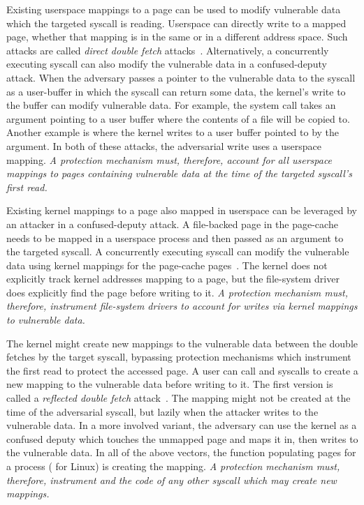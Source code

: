 \documentclass[letterpaper,twocolumn,10pt, anonymous]{article}
\begin{document}
Existing userspace mappings to a page can be used to modify 
vulnerable data which the targeted syscall is reading.
Userspace can directly write to a mapped page, whether that mapping is 
in the same or in a different address space. 
Such attacks are called \emph{direct double fetch} 
attacks~\cite{watson2007exploiting}.
Alternatively, a concurrently executing syscall can also modify the 
vulnerable data in a confused-deputy attack.
When the adversary passes a pointer to the vulnerable data to 
the syscall as a user-buffer in which the syscall can return some 
data, the kernel's write to the buffer can modify vulnerable data.
For example, the  system call takes an argument pointing 
to a user buffer where the contents of a file will be copied to.
Another example is  where the kernel writes to 
a user buffer pointed to by the  argument.
In both of these attacks, the adversarial write uses a userspace
mapping. 
\emph{A protection mechanism must, therefore, account for all userspace 
mappings to pages containing vulnerable data at the time of the 
targeted syscall's first read.}

Existing kernel mappings to a page also mapped in userspace can be 
leveraged by an attacker in a confused-deputy attack.
A file-backed page in the page-cache needs to be mapped in a
userspace process and then passed as an argument to the targeted syscall.
A concurrently executing  syscall can modify the 
vulnerable data using kernel mappings for the page-cache
pages~\cite{watson2007exploiting}.
The kernel does not explicitly track kernel addresses mapping to a page, 
but the file-system driver does explicitly find the page before writing to it.
\emph{A protection mechanism must, therefore, instrument file-system 
drivers to account for writes via kernel mappings to vulnerable data.}

The kernel might create new mappings to the vulnerable data 
between the double fetches by the target syscall, bypassing protection 
mechanisms which instrument the first read to protect the accessed page.
A user can call  and  syscalls to create 
a new mapping to the vulnerable data before writing to it.
The first version is called a \emph{reflected double fetch} 
attack~\cite{watson2007exploiting}.
The mapping might not be created at the time of the adversarial syscall, 
but lazily when the attacker writes to the vulnerable data.
In a more involved variant, the adversary can use the kernel as a 
confused deputy which touches the unmapped page and maps it in, 
then writes to the vulnerable data.
In all of the above vectors, the function populating pages for a 
process ( for Linux) is creating the mapping.
\emph{A protection mechanism must, therefore, instrument 
and the code of any other syscall which may create new mappings.}
\end{document}
